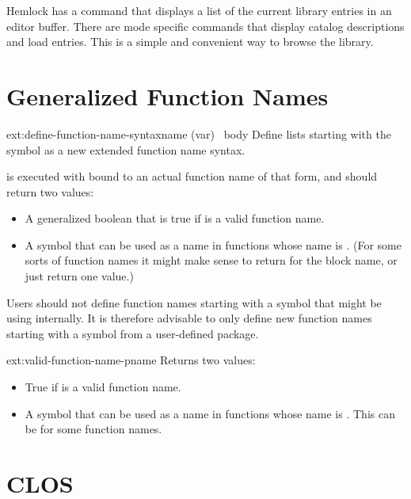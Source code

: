 Hemlock has a command  that displays a list of the current
library entries in an editor buffer.  There are mode specific commands that
display catalog descriptions and load entries.  This is a simple and convenient
way to browse the library.


\section{Generalized Function Names}

\begin{defmac}{ext:}{define-function-name-syntax}{name (var) \ampbody\ body}
  Define lists starting with the symbol  as a new extended
  function name syntax.
  
   is executed with  bound to an actual function
  name of that form, and should return two values:

  \begin{itemize}
  \item A generalized boolean that is true if  is a valid
    function name.
  \item A symbol that can be used as a  name in functions
    whose name is .  (For some sorts of function names it
    might make sense to return  for the block name, or just
    return one value.)
  \end{itemize}
  
  Users should not define function names starting with a symbol that
  \cmucl{} might be using internally.  It is therefore advisable to
  only define new function names starting with a symbol from a
  user-defined package.
\end{defmac}

\begin{defun}{ext:}{valid-function-name-p}{name}
  Returns two values:

  \begin{itemize}
  \item True if  is a valid function name.
  \item A symbol that can be used as a  name in
    functions whose name is .  This can be 
    for some function names.
  \end{itemize}
\end{defun}



\section{CLOS}

